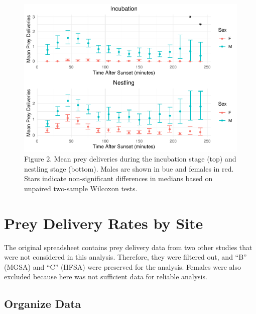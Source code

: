 \documentclass[]{article}
\newenvironment{Shaded}{\begin{snugshade}}{\end{snugshade}}
\newcommand{\KeywordTok}[1]{\textcolor[rgb]{0.13,0.29,0.53}{\textbf{#1}}}
\newcommand{\NormalTok}[1]{#1}
\newcommand{\OperatorTok}[1]{\textcolor[rgb]{0.81,0.36,0.00}{\textbf{#1}}}
\newcommand{\StringTok}[1]{\textcolor[rgb]{0.31,0.60,0.02}{#1}}
\begin{document}
\begin{figure}
\centering
\includegraphics{../manuscript/figures/plot_sex.pdffinal_plot_sex-1.pdf}
\caption{Figure 2. Mean prey deliveries during the incubation stage
(top) and nestling stage (bottom). Males are shown in bue and females in
red. Stars indicate non-significant differences in medians based on
unpaired two-sample Wilcoxon tests.}
\end{figure}

\hypertarget{prey-delivery-rates-by-site}{%
\section{Prey Delivery Rates by
Site}\label{prey-delivery-rates-by-site}}

The original spreadsheet contains prey delivery data from two other
studies that were not considered in this analysis. Therefore, they were
filtered out, and ``B'' (MGSA) and ``C'' (HFSA) were preserved for the
analysis. Females were also excluded because here was not sufficient
data for reliable analysis.

\begin{Shaded}
\end{Shaded}

\hypertarget{organize-data-1}{%
\subsection{Organize Data}\label{organize-data-1}}
\end{document}
